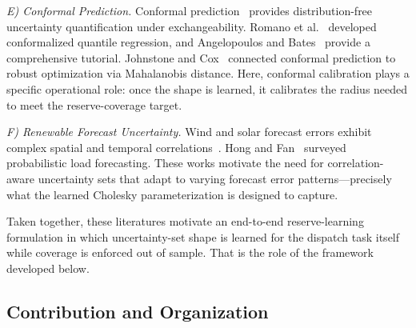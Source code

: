 \documentclass[11pt]{article}
\theoremstyle{definition}
\begin{document}
\emph{E) Conformal Prediction.}
Conformal prediction~\citep{vovk2005algorithmic} provides distribution-free uncertainty quantification under exchangeability. Romano et al.~\citep{romano2019conformalized} developed conformalized quantile regression, and Angelopoulos and Bates~\citep{angelopoulos2023conformal} provide a comprehensive tutorial. Johnstone and Cox~\citep{johnstone2021conformal} connected conformal prediction to robust optimization via Mahalanobis distance. Here, conformal calibration plays a specific operational role: once the shape is learned, it calibrates the radius needed to meet the reserve-coverage target.

\emph{F) Renewable Forecast Uncertainty.}
Wind and solar forecast errors exhibit complex spatial and temporal correlations~\citep{hodge2011wind,pinson2013wind}. Hong and Fan~\citep{hong2016probabilistic} surveyed probabilistic load forecasting. These works motivate the need for correlation-aware uncertainty sets that adapt to varying forecast error patterns---precisely what the learned Cholesky parameterization is designed to capture.

Taken together, these literatures motivate an end-to-end reserve-learning formulation in which uncertainty-set shape is learned for the dispatch task itself while coverage is enforced out of sample. That is the role of the framework developed below.

\subsection{Contribution and Organization}
\end{document}
